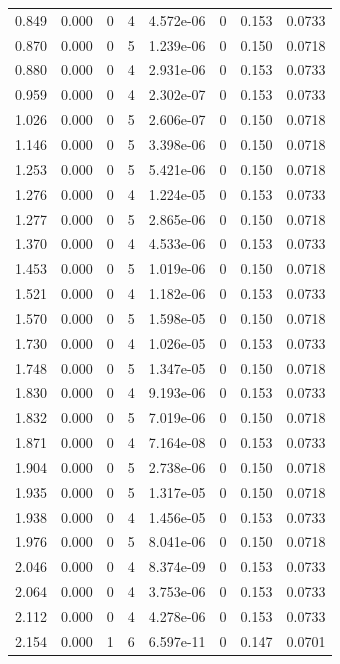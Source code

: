 \documentclass[preview]{standalone}
\begin{document}
{{\begin{tabular}{L{1.2cm}C{1.2cm} C{0.3cm}C{0.5cm} C{1.4cm}C{1.4cm} C{1.4cm}C{1.4cm}}
  0.849  &  0.000  & 0     &  4 &  4.572e-06  & 0  & 0.153 &  0.0733   \\ 
  0.870  &  0.000  & 0     &  5 &  1.239e-06  & 0  & 0.150 &  0.0718   \\ 
  0.880  &  0.000  & 0     &  4 &  2.931e-06  & 0  & 0.153 &  0.0733   \\ 
  0.959  &  0.000  & 0     &  4 &  2.302e-07  & 0  & 0.153 &  0.0733   \\ 
  1.026  &  0.000  & 0     &  5 &  2.606e-07  & 0  & 0.150 &  0.0718   \\ 
  1.146  &  0.000  & 0     &  5 &  3.398e-06  & 0  & 0.150 &  0.0718   \\ 
  1.253  &  0.000  & 0     &  5 &  5.421e-06  & 0  & 0.150 &  0.0718   \\ 
  1.276  &  0.000  & 0     &  4 &  1.224e-05  & 0  & 0.153 &  0.0733   \\ 
  1.277  &  0.000  & 0     &  5 &  2.865e-06  & 0  & 0.150 &  0.0718   \\ 
  1.370  &  0.000  & 0     &  4 &  4.533e-06  & 0  & 0.153 &  0.0733   \\ 
  1.453  &  0.000  & 0     &  5 &  1.019e-06  & 0  & 0.150 &  0.0718   \\ 
  1.521  &  0.000  & 0     &  4 &  1.182e-06  & 0  & 0.153 &  0.0733   \\ 
  1.570  &  0.000  & 0     &  5 &  1.598e-05  & 0  & 0.150 &  0.0718   \\ 
  1.730  &  0.000  & 0     &  4 &  1.026e-05  & 0  & 0.153 &  0.0733   \\ 
  1.748  &  0.000  & 0     &  5 &  1.347e-05  & 0  & 0.150 &  0.0718   \\ 
  1.830  &  0.000  & 0     &  4 &  9.193e-06  & 0  & 0.153 &  0.0733   \\ 
  1.832  &  0.000  & 0     &  5 &  7.019e-06  & 0  & 0.150 &  0.0718   \\ 
  1.871  &  0.000  & 0     &  4 &  7.164e-08  & 0  & 0.153 &  0.0733   \\ 
  1.904  &  0.000  & 0     &  5 &  2.738e-06  & 0  & 0.150 &  0.0718   \\ 
  1.935  &  0.000  & 0     &  5 &  1.317e-05  & 0  & 0.150 &  0.0718   \\ 
  1.938  &  0.000  & 0     &  4 &  1.456e-05  & 0  & 0.153 &  0.0733   \\ 
  1.976  &  0.000  & 0     &  5 &  8.041e-06  & 0  & 0.150 &  0.0718   \\ 
  2.046  &  0.000  & 0     &  4 &  8.374e-09  & 0  & 0.153 &  0.0733   \\ 
  2.064  &  0.000  & 0     &  4 &  3.753e-06  & 0  & 0.153 &  0.0733   \\ 
  2.112  &  0.000  & 0     &  4 &  4.278e-06  & 0  & 0.153 &  0.0733   \\ 
  2.154  &  0.000  & 1     &  6 &  6.597e-11  & 0  & 0.147 &  0.0701   \\ 
\hline 
\end{tabular} 

}}
\end{document}
